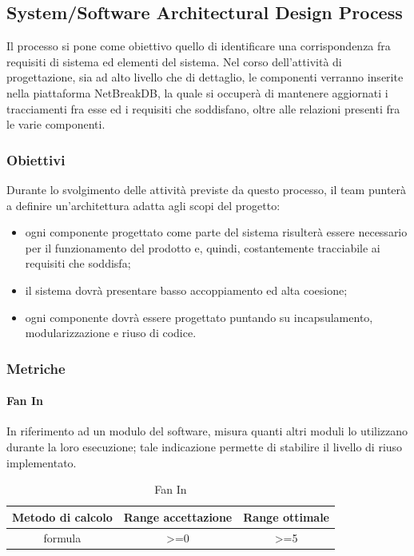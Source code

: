 	\subsection{System/Software Architectural Design Process}
	Il processo si pone come obiettivo quello di identificare una corrispondenza fra requisiti di sistema
	ed elementi del sistema.
	Nel corso dell’attività di progettazione, sia ad alto livello che di dettaglio, le componenti verranno
	inserite nella piattaforma NetBreakDB, la quale si occuperà di mantenere aggiornati i tracciamenti fra esse ed i requisiti che soddisfano, oltre alle relazioni presenti fra le varie componenti.
		\subsubsection{Obiettivi}
		Durante lo svolgimento delle attività previste da questo processo, il team punterà a definire
		un’architettura adatta agli scopi del progetto:
		\begin{itemize}
			\item ogni componente progettato come parte del sistema risulterà essere necessario per il funzionamento del prodotto e, quindi, costantemente tracciabile ai requisiti che soddisfa;
			\item il sistema dovrà presentare basso accoppiamento ed alta coesione;
			\item ogni componente dovrà essere progettato puntando su incapsulamento, modularizzazione
			e riuso di codice.
		\end{itemize}
		
		\subsubsection{Metriche}
			\paragraph{Fan In}
			In riferimento ad un modulo del software, misura quanti altri moduli lo utilizzano durante la
			loro esecuzione; tale indicazione permette di stabilire il livello di riuso implementato.
			\begin{table}[H]
				\begin{center}
					\begin{tabular}{|c|c|c|}
						\hline
						\textbf{Metodo di calcolo} & \textbf{Range accettazione} & \textbf{Range ottimale} \\
						\hline
						formula & >=0  & >=5 \\
						\hline
					\end{tabular}
				\end{center}
				\caption{Fan In}
			\end{table}
			

